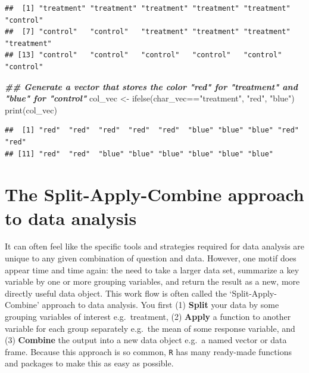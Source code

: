 \documentclass[
]{book}
\newenvironment{Shaded}{\begin{snugshade}}{\end{snugshade}}
\newcommand{\DocumentationTok}[1]{\textcolor[rgb]{0.56,0.35,0.01}{\textbf{\textit{#1}}}}
\newcommand{\FunctionTok}[1]{\textcolor[rgb]{0.00,0.00,0.00}{#1}}
\newcommand{\NormalTok}[1]{#1}
\newcommand{\OtherTok}[1]{\textcolor[rgb]{0.56,0.35,0.01}{#1}}
\newcommand{\SpecialCharTok}[1]{\textcolor[rgb]{0.00,0.00,0.00}{#1}}
\newcommand{\StringTok}[1]{\textcolor[rgb]{0.31,0.60,0.02}{#1}}
\begin{document}
\begin{verbatim}
##  [1] "treatment" "treatment" "treatment" "treatment" "treatment" "control"  
##  [7] "control"   "control"   "treatment" "treatment" "treatment" "treatment"
## [13] "control"   "control"   "control"   "control"   "control"   "control"
\end{verbatim}

\begin{Shaded}
\begin{Highlighting}[]
\DocumentationTok{\#\# Generate a vector that stores the color "red" for "treatment" and "blue" for "control"}
\NormalTok{col\_vec }\OtherTok{\textless{}{-}} \FunctionTok{ifelse}\NormalTok{(char\_vec}\SpecialCharTok{==}\StringTok{"treatment"}\NormalTok{, }\StringTok{"red"}\NormalTok{, }\StringTok{"blue"}\NormalTok{)}
\FunctionTok{print}\NormalTok{(col\_vec)}
\end{Highlighting}
\end{Shaded}

\begin{verbatim}
##  [1] "red"  "red"  "red"  "red"  "red"  "blue" "blue" "blue" "red"  "red" 
## [11] "red"  "red"  "blue" "blue" "blue" "blue" "blue" "blue"
\end{verbatim}

\hypertarget{the-split-apply-combine-approach-to-data-analysis}{%
\section{The Split-Apply-Combine approach to data analysis}\label{the-split-apply-combine-approach-to-data-analysis}}

It can often feel like the specific tools and strategies required for data analysis are unique to any given combination of question and data. However, one motif does appear time and time again: the need to take a larger data set, summarize a key variable by one or more grouping variables, and return the result as a new, more directly useful data object. This work flow is often called the `Split-Apply-Combine' approach to data analysis. You first (1) \textbf{Split} your data by some grouping variables of interest e.g.~treatment, (2) \textbf{Apply} a function to another variable for each group separately e.g.~the mean of some response variable, and (3) \textbf{Combine} the output into a new data object e.g.~a named vector or data frame. Because this approach is so common, \texttt{R} has many ready-made functions and packages to make this as easy as possible.
\end{document}
